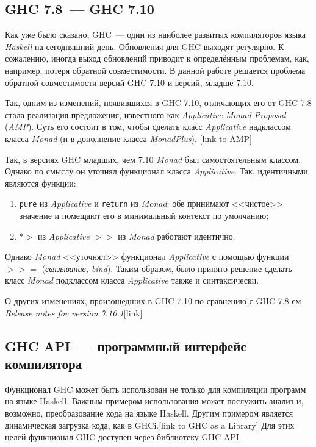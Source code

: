 \subsection{GHC 7.8~--- GHC 7.10}\label{710}
Как уже было сказано, GHC~--- один из наиболее развитых компиляторов языка \textit{Haskell} на сегодняшний день. Обновления для GHC выходят регулярно. К сожалению, иногда выход обновлений приводит к определённым проблемам, как, например, потеря обратной совместимости. В данной работе решается проблема обратной совместимости версий GHC 7.10 и версий, младше 7.10.

Так, одним из изменений, появившихся в GHC 7.10, отличающих его от GHC 7.8 стала реализация предложения, известного как \textit{Applicative Monad Proposal} (\textit{AMP}). Суть его состоит в том, чтобы сделать класс \textit{Applicative} надклассом класса \textit{Monad} (и в дополнение класса \textit{MonadPlus}). [link to AMP] 

Так, в версиях GHC младших, чем 7.10 \textit{Monad} был самостоятельным классом. Однако по смыслу он уточнял функционал класса \textit{Applicative}. Так, идентичными являются функции:
\begin{enumerate}[1)]
\item \lstinline{pure} из \textit{Applicative} и \lstinline{return} из \textit{Monad}: обе принимают <<чистое>> значение и помещают его в минимальный контекст по умолчанию;
\item \textbf{$*>$} из \textit{Applicative} \textbf{$>>$} из \textit{Monad} работают идентично.
\end{enumerate}
Однако \textit{Monad} <<уточнял>> функционал \textit{Applicative} с помощью функции \textbf{$>>=$} (\textit{связывание, bind}). Таким образом, было принято решение сделать класс \textit{Monad} подклассом класса \textit{Applicative} также и синтаксически.

О других изменениях, произошедших в GHC 7.10 по сравнению с GHC 7.8 см \textit{Release notes for version 7.10.1}[link]


\subsection{GHC API~--- программный интерфейс компилятора}\label{ghcapi}
Функционал GHC может быть использован не только для компиляции программ на языке Haskell. Важным примером использования может послужить анализ и, возможно, преобразование кода на языке Haskell. Другим примером является динамическая загрузка кода, как в GHCi.[link to GHC as a Library] Для этих целей функционал GHC доступен через библиотеку GHC API.

